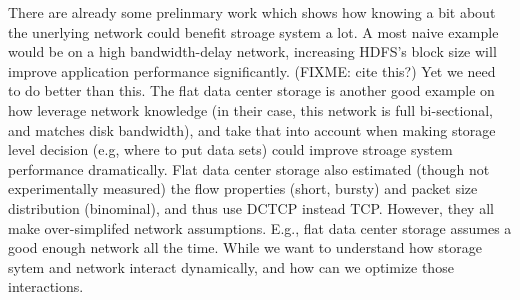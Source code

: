 There are already some prelinmary work which shows how knowing a bit about the unerlying network could benefit stroage system a lot. A most naive example would be on a high bandwidth-delay network, increasing HDFS's block size will improve application performance significantly. (FIXME: cite this?) Yet we need to do better than this. The flat data center storage \cite{fds} is another good example on how leverage network knowledge (in their case, this network is full bi-sectional, and matches disk bandwidth), and take that into account when making storage level decision (e.g, where to put data sets) could improve stroage system performance dramatically. Flat data center storage also estimated (though not experimentally measured) the flow properties (short, bursty) and packet size distribution (binominal), and thus use DCTCP instead TCP. However, they all make over-simplifed network assumptions. E.g., flat data center storage assumes a good enough network all the time. While we want to understand how storage sytem and network interact dynamically, and how can we optimize those interactions.





